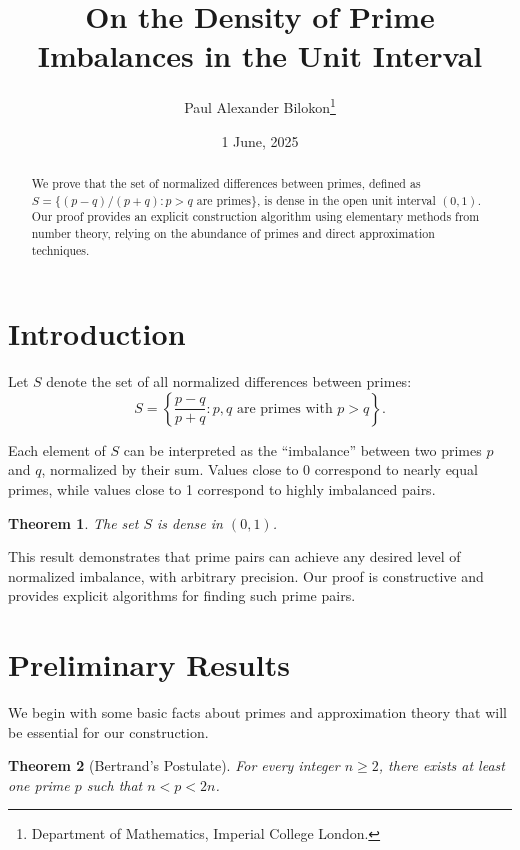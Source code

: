\documentclass[11pt]{article}
\title{On the Density of Prime Imbalances in the Unit Interval}
\author{Paul Alexander Bilokon\thanks{Department of Mathematics, Imperial College London.}}
\date{1 June, 2025}
\newtheorem{theorem}{Theorem}
\begin{document}
\maketitle

\begin{abstract}
We prove that the set of normalized differences between primes, defined as $S = \{(p - q)/(p + q) : p > q \text{ are primes}\}$, is dense in the open unit interval $(0, 1)$. Our proof provides an explicit construction algorithm using elementary methods from number theory, relying on the abundance of primes and direct approximation techniques.
\end{abstract}

\section{Introduction}

Let $S$ denote the set of all normalized differences between primes:
\begin{equation}
S = \left\{\frac{p - q}{p + q} : p, q \text{ are primes with } p > q\right\}. \label{eq:S_definition}
\end{equation}

Each element of $S$ can be interpreted as the ``imbalance'' between two primes $p$ and $q$, normalized by their sum. Values close to 0 correspond to nearly equal primes, while values close to 1 correspond to highly imbalanced pairs.

\begin{theorem}\label{thm:main}
The set $S$ is dense in $(0, 1)$.
\end{theorem}

This result demonstrates that prime pairs can achieve any desired level of normalized imbalance, with arbitrary precision. Our proof is constructive and provides explicit algorithms for finding such prime pairs.

\section{Preliminary Results}

We begin with some basic facts about primes and approximation theory that will be essential for our construction.

\begin{theorem}[Bertrand's Postulate]\label{thm:bertrand}
For every integer $n \geq 2$, there exists at least one prime $p$ such that $n < p < 2n$.
\end{theorem}
\end{document}
